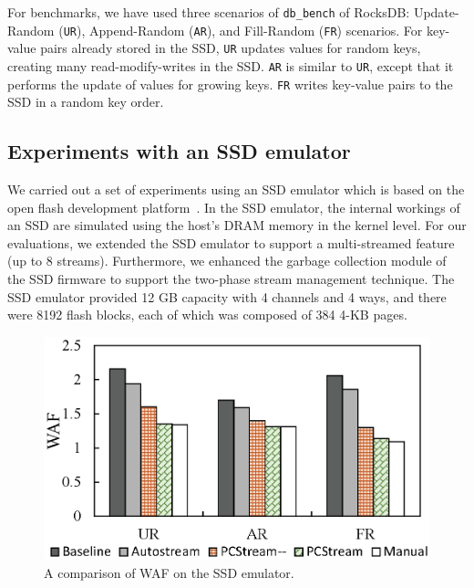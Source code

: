 For benchmarks, we have used three scenarios of \texttt{db\_bench} of RocksDB:
Update-Random (\texttt{UR}), Append-Random (\texttt{AR}), and Fill-Random
(\texttt{FR}) scenarios.  For key-value pairs already stored in the SSD,
\texttt{UR} updates values for random keys, creating many
read-modify-writes in the SSD.  \texttt{AR} is similar to \texttt{UR}, except
that it performs the update of values for growing keys. \texttt{FR} writes
key-value pairs to the SSD in a random key order.

\subsection{Experiments with an SSD emulator}

We carried out a set of experiments using an SSD emulator which is based on the
open flash development platform~\cite{AMF}.  
In the SSD emulator, the internal workings of an SSD are simulated using the host's DRAM memory in the kernel level. 
For our evaluations, we extended the SSD emulator to support a multi-streamed feature %
(up to 8 streams). %
Furthermore, we enhanced the garbage collection module of the SSD firmware to support the two-phase stream management technique. 
The SSD emulator provided 12 GB capacity with 4 channels and 4 ways, and there were 8192 flash blocks, each of which was composed of 384 4-KB pages.  

\begin{figure}[t]
	\centering
	\includegraphics[scale=0.6]{figure/pcstream/result_emul}
	\caption{A comparison of WAF on the SSD emulator.}
	\label{fig:result_emul}
\end{figure}


